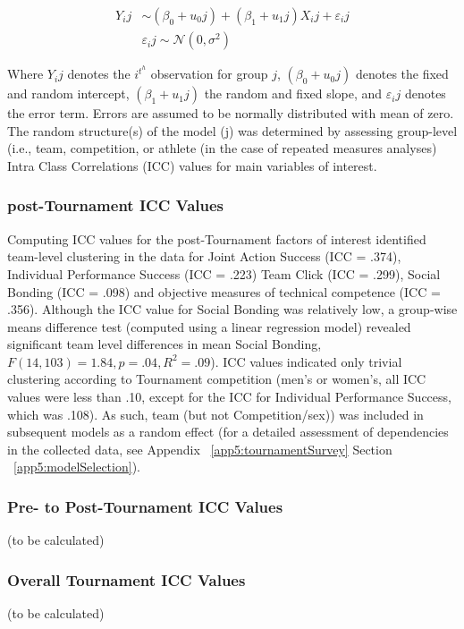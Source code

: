    \begin{align*}
      Y_ij & \sim  (\beta_0 + u_0j) + (\beta_1 + u_1j)X_ij + \varepsilon_ij\\
           & \varepsilon_ij \sim \mathcal{N}(0,\sigma^{2})
    \end{align*}


Where $Y_ij$ denotes the $i^t^h$ observation for group $j$, $(\beta_0 + u_0j)$ denotes the fixed and random intercept, $(\beta_1 + u_1j)$ the random and fixed slope, and $\varepsilon_ij$ denotes the error term.  Errors are assumed to be normally distributed with mean of zero.  The random structure(s) of the model (j) was determined by assessing  group-level (i.e., team, competition, or athlete (in the case of repeated measures analyses) Intra Class Correlations (ICC) values for main variables of interest.

\subsubsection{post-Tournament ICC Values}
Computing ICC values for the post-Tournament factors of interest identified team-level clustering in the data for Joint Action Success (ICC = .374), Individual Performance Success (ICC = .223) Team Click (ICC = .299), Social Bonding (ICC = .098) and objective measures of technical competence (ICC = .356). Although the ICC value for Social Bonding was relatively low, a group-wise means difference test (computed using a linear regression model) revealed significant team level differences in mean Social Bonding, $F(14, 103) = 1.84, p = .04, R^2 = .09$). ICC values indicated only trivial clustering according to Tournament competition (men's or women's, all ICC values were less than .10, except for the ICC for Individual Performance Success, which was .108).  As such, team (but not Competition/sex)) was included in subsequent models as a random effect (for a detailed assessment of dependencies in the collected data, see Appendix ~\ref{app5:tournamentSurvey} Section ~\ref{app5:modelSelection}).


\subsubsection{Pre- to Post-Tournament ICC Values}
(to be calculated)
\subsubsection{Overall Tournament ICC Values}
(to be calculated)


